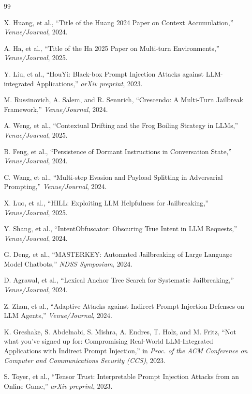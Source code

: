 \documentclass[conference]{IEEEtran}
\begin{document}
\begin{thebibliography}{99}

X. Huang, et al., ``Title of the Huang 2024 Paper on Context Accumulation,'' \textit{Venue/Journal}, 2024.

A. Ha, et al., ``Title of the Ha 2025 Paper on Multi-turn Environments,'' \textit{Venue/Journal}, 2025.

Y. Liu, et al., ``HouYi: Black-box Prompt Injection Attacks against LLM-integrated Applications,'' \textit{arXiv preprint}, 2023.

M. Russinovich, A. Salem, and R. Sennrich, ``Crescendo: A Multi-Turn Jailbreak Framework,'' \textit{Venue/Journal}, 2024.

A. Weng, et al., ``Contextual Drifting and the Frog Boiling Strategy in LLMs,'' \textit{Venue/Journal}, 2025.

B. Feng, et al., ``Persistence of Dormant Instructions in Conversation State,'' \textit{Venue/Journal}, 2024.

C. Wang, et al., ``Multi-step Evasion and Payload Splitting in Adversarial Prompting,'' \textit{Venue/Journal}, 2024.

X. Luo, et al., ``HILL: Exploiting LLM Helpfulness for Jailbreaking,'' \textit{Venue/Journal}, 2025.

Y. Shang, et al., ``IntentObfuscator: Obscuring True Intent in LLM Requests,'' \textit{Venue/Journal}, 2024.

G. Deng, et al., ``MASTERKEY: Automated Jailbreaking of Large Language Model Chatbots,'' \textit{NDSS Symposium}, 2024.

D. Agrawal, et al., ``Lexical Anchor Tree Search for Systematic Jailbreaking,'' \textit{Venue/Journal}, 2024.

Z. Zhan, et al., ``Adaptive Attacks against Indirect Prompt Injection Defenses on LLM Agents,'' \textit{Venue/Journal}, 2024.

K. Greshake, S. Abdelnabi, S. Mishra, A. Endres, T. Holz, and M. Fritz, ``Not what you've signed up for: Compromising Real-World LLM-Integrated Applications with Indirect Prompt Injection,'' in \textit{Proc. of the ACM Conference on Computer and Communications Security (CCS)}, 2023.

S. Toyer, et al., ``Tensor Trust: Interpretable Prompt Injection Attacks from an Online Game,'' \textit{arXiv preprint}, 2023.


\end{thebibliography}
\end{document}
